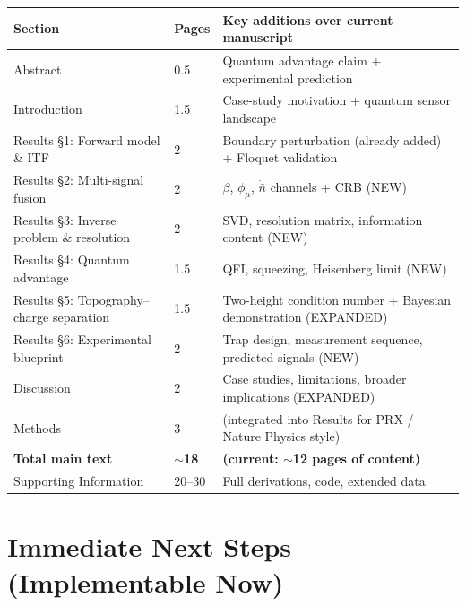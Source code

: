 \documentclass[11pt,a4paper]{article}
\begin{document}
\begin{center}
\begin{tabular}{@{}lll@{}}
\toprule
Section & Pages & Key additions over current manuscript \\
\midrule
Abstract & 0.5 & Quantum advantage claim + experimental prediction \\
Introduction & 1.5 & Case-study motivation + quantum sensor landscape \\
Results \S1: Forward model \& ITF & 2 & Boundary perturbation (already added) + Floquet validation \\
Results \S2: Multi-signal fusion & 2 & $\beta$, $\phi_\mu$, $\dot{\bar{n}}$ channels + CRB (NEW) \\
Results \S3: Inverse problem \& resolution & 2 & SVD, resolution matrix, information content (NEW) \\
Results \S4: Quantum advantage & 1.5 & QFI, squeezing, Heisenberg limit (NEW) \\
Results \S5: Topography--charge separation & 1.5 & Two-height condition number + Bayesian demonstration (EXPANDED) \\
Results \S6: Experimental blueprint & 2 & Trap design, measurement sequence, predicted signals (NEW) \\
Discussion & 2 & Case studies, limitations, broader implications (EXPANDED) \\
Methods & 3 & (integrated into Results for PRX / Nature Physics style) \\
\hline
\textbf{Total main text} & \textbf{$\sim$18} & \textbf{(current: $\sim$12 pages of content)} \\
Supporting Information & 20--30 & Full derivations, code, extended data \\
\bottomrule
\end{tabular}
\end{center}

\section{Immediate Next Steps (Implementable Now)}
\end{document}
